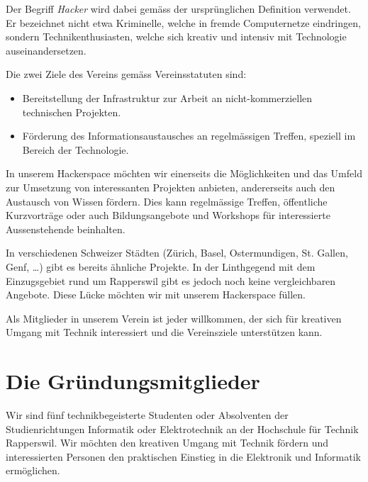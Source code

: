 \documentclass[10pt,a4paper,parskip,fleqn]{scrartcl}
\begin{document}
Der Begriff \textit{Hacker} wird dabei gemäss der ursprünglichen Definition
verwendet. Er bezeichnet nicht etwa Kriminelle, welche in fremde Computernetze
eindringen, sondern Technikenthusiasten, welche sich kreativ und intensiv mit
Technologie auseinandersetzen.

Die zwei Ziele des Vereins gemäss Vereinsstatuten sind:

\begin{itemize}
		\item Bereitstellung der Infrastruktur zur Arbeit an nicht-kommerziellen
			technischen Projekten.
		\item Förderung des Informationsaustausches an regelmässigen Treffen,
			speziell im Bereich der Technologie.
\end{itemize}

In unserem Hackerspace möchten wir einerseits die Möglichkeiten und das Umfeld
zur Umsetzung von interessanten Projekten anbieten, andererseits auch den
Austausch von Wissen fördern. Dies kann regelmässige Treffen, öffentliche
Kurzvorträge oder auch Bildungsangebote und Workshops für interessierte
Aussenstehende beinhalten.

In verschiedenen Schweizer Städten (Zürich, Basel, Ostermundigen, St.  Gallen,
Genf, \ldots) gibt es bereits ähnliche Projekte. In der Linthgegend mit dem
Einzugsgebiet rund um Rapperswil gibt es jedoch noch keine vergleichbaren
Angebote. Diese Lücke möchten wir mit unserem Hackerspace füllen.

Als Mitglieder in unserem Verein ist jeder willkommen, der sich für kreativen
Umgang mit Technik interessiert und die Vereinsziele unterstützen kann.


\section{Die Gründungsmitglieder}

Wir sind fünf technikbegeisterte Studenten oder Absolventen der
Studienrichtungen Informatik oder Elektrotechnik an der Hochschule für Technik
Rapperswil. Wir möchten den kreativen Umgang mit Technik fördern und
interessierten Personen den praktischen Einstieg in die Elektronik und
Informatik ermöglichen.

\end{document}
